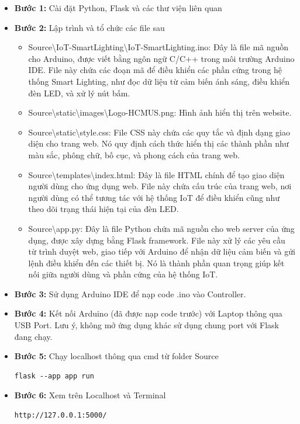 \begin{itemize}
    \item \textbf{Bước 1:} Cài đặt Python, Flask và các thư viện liên quan
    \item \textbf{Bước 2:} Lập trình và tổ chức các file sau

    \begin{itemize}
        \item Source\textbackslash IoT-SmartLighting\textbackslash IoT-SmartLighting.ino: Đây là file mã nguồn cho Arduino, được viết bằng ngôn ngữ C/C++ trong môi trường Arduino IDE. File này chứa các đoạn mã để điều khiển các phần cứng trong hệ thống Smart Lighting, như đọc dữ liệu từ cảm biến ánh sáng, điều khiển đèn LED, và xử lý nút bấm.
        \item Source\textbackslash static\textbackslash images\textbackslash Logo-HCMUS.png: Hình ảnh hiển thị trên website. 
        \item Source\textbackslash static\textbackslash style.css: File CSS này chứa các quy tắc và định dạng giao diện cho trang web. Nó quy định cách thức hiển thị các thành phần như màu sắc, phông chữ, bố cục, và phong cách của trang web.
        \item Source\textbackslash templates\textbackslash index.html: Đây là file HTML chính để tạo giao diện người dùng cho ứng dụng web. File này chứa cấu trúc của trang web, nơi người dùng có thể tương tác với hệ thống IoT để điều khiển cũng như theo dõi trạng thái hiện tại của đèn LED. 
        \item Source\textbackslash app.py: Đây là file Python chứa mã nguồn cho web server của ứng dụng, được xây dựng bằng Flask framework. File này xử lý các yêu cầu từ trình duyệt web, giao tiếp với Arduino để nhận dữ liệu cảm biến và gửi lệnh điều khiển đến các thiết bị. Nó là thành phần quan trọng giúp kết nối giữa người dùng và phần cứng của hệ thống IoT.
    \end{itemize}

    \item \textbf{Bước 3:} Sử dụng Arduino IDE để nạp code .ino vào Controller. 
    \item \textbf{Bước 4:} Kết nối Arduino (đã được nạp code trước) với Laptop thông qua USB Port. Lưu ý, không mở ứng dụng khác sử dụng chung port với Flask đang chạy. 
    \item \textbf{Bước 5:} Chạy localhost thông qua cmd từ folder Source
    \begin{lstlisting}
flask --app app run\end{lstlisting}
    \item \textbf{Bước 6:} Xem trên Localhost và Terminal
    \begin{lstlisting}
http://127.0.0.1:5000/\end{lstlisting}

\end{itemize}
